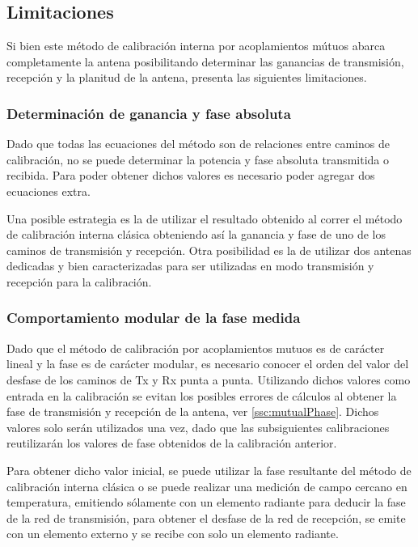 \subsection{Limitaciones}

Si bien este método de calibración interna por acoplamientos mútuos abarca completamente la antena posibilitando determinar las
ganancias de transmisión, recepción y la planitud de la antena, presenta las siguientes limitaciones.


\subsubsection{Determinación de ganancia y fase absoluta}

Dado que todas las ecuaciones del método son de relaciones entre caminos de calibración, no se puede determinar la potencia y
fase absoluta transmitida o recibida. Para poder obtener dichos valores es necesario poder agregar dos ecuaciones extra.

Una posible estrategia es la de utilizar el resultado obtenido al correr el método de calibración interna clásica obteniendo
así la ganancia y fase de uno de los caminos de transmisión y recepción. Otra posibilidad es la de utilizar dos antenas
dedicadas y bien caracterizadas para ser utilizadas en modo transmisión y recepción para la calibración.


\subsubsection{Comportamiento modular de la fase medida}

Dado que el método de calibración por acoplamientos mutuos es de carácter lineal y la fase es de carácter modular, es necesario 
conocer el orden del valor del desfase de los caminos de Tx y Rx punta a punta. Utilizando dichos valores como entrada en la
calibración se evitan los posibles errores de cálculos al obtener la fase de transmisión y recepción de la antena, ver
\ref{ssc:mutualPhase}. Dichos valores solo serán utilizados una vez, dado que las subsiguientes calibraciones reutilizarán los
valores de fase obtenidos de la calibración anterior.

Para obtener dicho valor inicial, se puede utilizar la fase resultante del método de calibración interna clásica o se puede
realizar una medición de campo cercano en temperatura, emitiendo sólamente con un elemento radiante para deducir la fase de la
red de transmisión, para obtener el desfase de la red de recepción, se emite con un elemento externo y se recibe con solo un
elemento radiante.


